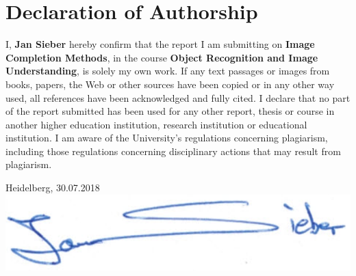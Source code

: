 \documentclass[
     11pt,         %
     a4paper,      %
     oneside,
     ]{article}
\newcommand{\mytitle}{Image Completion Methods}
\newcommand{\myauthor}{Jan Sieber}
\newcommand{\myseminar}{Object Recognition and Image Understanding}
\newcommand{\generalDate}{30.07.2018}
\begin{document}
\section*{Declaration of Authorship}
\vspace*{100pt}
I, \textbf{\myauthor} hereby confirm that the report I am submitting on \textbf{\mytitle}, in the course \textbf{\myseminar}, is solely my own work. If any text passages or images from books, papers,
the Web or other sources have been copied or in any other way used, all references have been acknowledged and fully cited.
I declare that no part of the report submitted has been used for any other report, thesis or course in
another higher education institution, research institution or educational institution. I am aware of the University's regulations concerning
plagiarism, including those regulations concerning disciplinary actions that may result from plagiarism.
\vspace*{50pt}

Heidelberg, \generalDate \hspace{2cm} \underline{\includegraphics[scale=0.2]{images/unterschrift.PNG}}
\newpage




\newpage
\tableofcontents
\newpage

\end{document}
